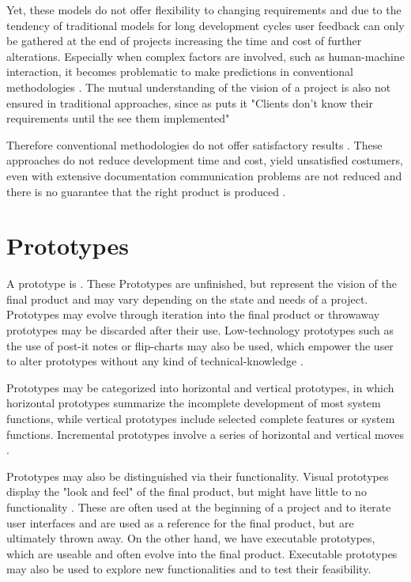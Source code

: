 \documentclass[runningheads]{llncs}
\begin{document}
Yet, these models do not offer flexibility to changing requirements and due to the tendency of 
traditional models for long development cycles user feedback can only be gathered at the end 
of projects \cite{ref_health} increasing the time and cost of further 
alterations. Especially when complex factors are involved, such as human-machine interaction,
it becomes problematic to make predictions in conventional methodologies \cite{ref_RPalternativeStrategy}. 
The mutual understanding of the vision of a project is also not ensured in traditional approaches, 
since as \cite{ref_RPalternativeStrategy}
puts it "Clients don't know their requirements until the see them implemented"

Therefore conventional methodologies do not offer satisfactory results \cite{ref_RPalternativeStrategy}.
These approaches do not reduce development time and cost, yield unsatisfied costumers,
even with extensive documentation communication problems are not reduced and there is 
no guarantee that the right product is produced \cite{ref_RPalternativeStrategy}.

\section{Prototypes}
A prototype is \cite[a working model of (parts of) an information system, 
which emphasizes specific aspects of that system]{ref_prac}. These Prototypes
are unfinished, but represent the vision of the final product and may vary depending 
on the state and needs of a project. Prototypes may evolve through iteration into the final product or
throwaway prototypes may be discarded after their use. Low-technology prototypes such as the use of post-it 
notes or flip-charts may also be used, which empower the user to alter prototypes 
without any kind of technical-knowledge \cite{ref_prac}. 

Prototypes may be categorized into horizontal and vertical prototypes, in which
horizontal prototypes summarize the incomplete development of most system functions,
while vertical prototypes include selected complete features or system functions.
Incremental prototypes involve a series of horizontal and vertical moves \cite{ref_prac}.

Prototypes may also be distinguished via their functionality. 
Visual prototypes display the "look and feel" of the final product, but might have little 
to no functionality \cite{ref_RPInAction}. These are often used at the beginning of a project and to iterate 
user interfaces and are used as a reference for the final product, but are ultimately thrown away.
On the other hand, we have executable prototypes, which are useable and often evolve into the final product.
Executable prototypes may also be used to explore new functionalities and to test their feasibility\cite{ref_RPInAction}.
\end{document}
